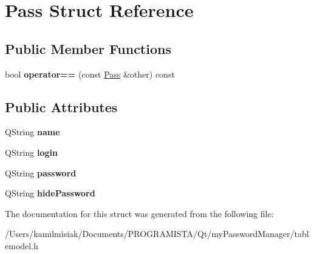 \hypertarget{struct_pass}{}\section{Pass Struct Reference}
\label{struct_pass}
\subsection*{Public Member Functions}
\begin{DoxyCompactItemize}
\item 
\mbox{\label{struct_pass_a5e36df7109c23d9266115aa2a4ecca01}} 
bool {\bfseries operator==} (const \mbox{\hyperlink{struct_pass}{Pass}} \&other) const
\end{DoxyCompactItemize}
\subsection*{Public Attributes}
\begin{DoxyCompactItemize}
\item 
\mbox{\label{struct_pass_a67d8341d813cfbf75922b0367d150e40}} 
Q\+String {\bfseries name}
\item 
\mbox{\label{struct_pass_a4c44eaccf9e8c07237e8e6533b866561}} 
Q\+String {\bfseries login}
\item 
\mbox{\label{struct_pass_a74cef59b59046742765e972350d13747}} 
Q\+String {\bfseries password}
\item 
\mbox{\label{struct_pass_a2bc5541a99e356a6ef031ea06320f6c4}} 
Q\+String {\bfseries hide\+Password}
\end{DoxyCompactItemize}


The documentation for this struct was generated from the following file\+:\begin{DoxyCompactItemize}
\item 
/\+Users/kamilmisiak/\+Documents/\+P\+R\+O\+G\+R\+A\+M\+I\+S\+T\+A/\+Qt/my\+Password\+Manager/tablemodel.\+h\end{DoxyCompactItemize}
